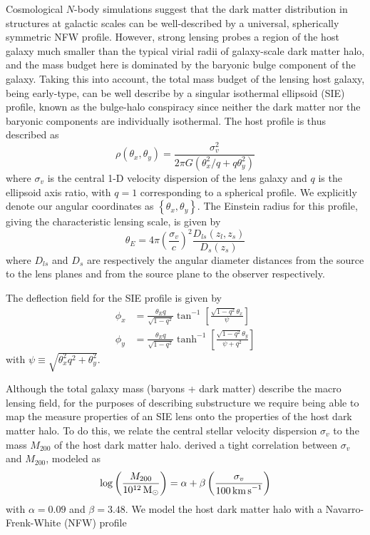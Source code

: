 \documentclass[twocolumn]{aastex62}
\begin{document}
Cosmological $N$-body simulations suggest that the dark matter distribution in structures at galactic scales can be well-described by a universal, spherically symmetric NFW profile. However, strong lensing probes a region of the host galaxy much smaller than the typical virial radii of galaxy-scale dark matter halo, and the mass budget here is dominated by the baryonic bulge component of the galaxy. Taking this into account, the total mass budget of the lensing host galaxy, being early-type, can be well describe by a singular isothermal ellipsoid (SIE) profile, known as the bulge-halo conspiracy since neither the dark matter nor the baryonic components are individually isothermal. The host profile is thus described as
\begin{equation}
\rho(\theta_x, \theta_y)=\frac{\sigma_{v}^{2}}{2 \pi G\left(\theta_x^{2} / q+q \theta_y^{2}\right)}
\label{eq:hostprofile}
\end{equation}
where $\sigma_{v}$ is the central 1-D velocity dispersion of the lens galaxy and $q$ is the ellipsoid axis ratio, with $q=1$ corresponding to a spherical profile. We explicitly denote our angular coordinates as $\left\{\theta_x, \theta_y\right\}$. The Einstein radius for this profile, giving the characteristic lensing scale, is given by
\begin{equation}
\theta_{{E}}=4 \pi\left(\frac{\sigma_{v}}{c}\right)^{2} \frac{D_{l s}\left(z_{l}, z_{s}\right)}{D_{s}\left(z_{s}\right)}
\label{eq:siethetae}
\end{equation}
where $D_{ls}$ and $D_s$ are respectively the angular diameter distances from the source to the lens planes and from the source plane to the observer respectively.

The deflection field for the SIE profile is given by~\citep{2001astro.ph..2341K}
\begin{align}
\phi_{x} &=\frac{\theta_E q}{\sqrt{1-q^{2}}} \tan ^{-1}\left[\frac{\sqrt{1-q^{2}} \theta_x}{\psi}\right] \\
\phi_{y} &=\frac{\theta_E q}{\sqrt{1-q^{2}}} \tanh ^{-1}\left[\frac{\sqrt{1-q^{2}} \theta_y}{\psi+q^{2} }\right]
\end{align}
with $\psi \equiv \sqrt{\theta_x^2 q^2 + \theta_y^2}$.

Although the total galaxy mass (baryons + dark matter) describe the macro lensing field, for the purposes of describing substructure we require being able to map the measure properties of an SIE lens onto the properties of the host dark matter halo. To do this, we relate the central stellar velocity dispersion $\sigma_v$ to the mass $M_{200}$ of the host dark matter halo. \citet{2018ApJ...859...96Z} derived a tight correlation between $\sigma_v$ and $M_{200}$, modeled as
\begin{equation}
\log\left(\frac{M_{200}}{10^{12}\,\Msun}\right) = \alpha + \beta\left(\frac{\sigma_v}{100\,\kmps}\right)
\label{eq:sigma_v_M_200_relation}
\end{equation}
with $\alpha = 0.09$ and $\beta = 3.48$. %
We model the host dark matter halo with a Navarro-Frenk-White (NFW) profile~\citep{1996ApJ...462..563N,1997ApJ...490..493N}
\end{document}
